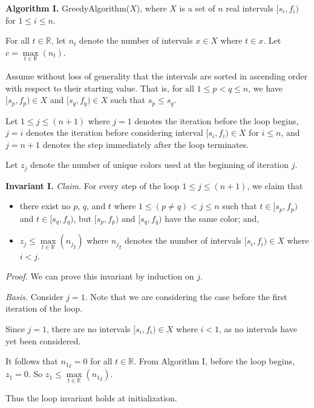 \begin{enumerate}
\begin{solution}
\textbf{Algorithm I. }{\sc GreedyAlgorithm}($X$), where $X$ is a set of $n$ real intervals $[s_i,f_i)$ for $1\leq i\leq n$.

For all $t\in\mathbb{R}$, let $n_t$ denote the number of intervals $x\in X$ where $t\in x$. Let $c=\underset{t\in\mathbb{R}}{\max}(n_t)$. 

Assume without loss of generality that the intervals are sorted in ascending order with respect to their starting value. That is, for all $1\leq p<q\leq n$, we have $[s_p,f_p)\in X$ and $[s_q,f_q)\in X$ such that $s_p\leq s_q$.

Let $1\leq j\leq(n+1)$ where $j=1$ denotes the iteration before the loop begins, $j=i$ denotes the iteration before considering interval $[s_i,f_i)\in X$ for $i\leq n$, and $j=n+1$ denotes the step immediately after the loop terminates.

Let $z_j$ denote the number of unique colors used at the beginning of iteration $j$.

\textbf{Invariant I. }\textit{Claim. }For every step of the loop $1\leq j\leq(n+1)$, we claim that
\begin{itemize}
\item there exist no $p$, $q$, and $t$ where $1\leq (p\neq q)<j\leq n$ such that $t\in[s_p,f_p)$ and $t\in[s_q,f_q)$, but $[s_p,f_p)$ and $[s_q,f_q)$ have the same color; and,
\item$z_j\leq\underset{t\in\mathbb{R}}{\max}({n_j}_t)$ where ${n_j}_t$ denotes the number of intervals $[s_i,f_i)\in X$ where $i<j$.
\end{itemize}
\textit{Proof. }We can prove this invariant by induction on $j$.

\textit{Basis. }Consider $j=1$. Note that we are considering the case before the first iteration of the loop.

Since $j=1$, there are no intervals $[s_i,f_i)\in X$ where $i<1$, as no intervals have yet been considered.

It follows that ${n_1}_t=0$ for all $t\in\mathbb{R}$. From Algorithm I, before the loop begins, $z_1=0$. So $z_1\leq\underset{t\in\mathbb{R}}{\max}({n_1}_t)$.

Thus the loop invariant holds at initialization.


\end{solution}
\end{enumerate}
